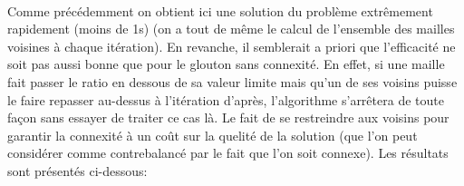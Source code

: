 \documentclass[a4paper, 11pt]{article} %
\begin{document}
\paragraph*{}
Comme précédemment on obtient ici une solution du problème extrêmement rapidement (moins de 1s) (on a tout de même le calcul de l'ensemble des mailles voisines à chaque itération). En revanche, il semblerait a priori que l'efficacité ne soit pas aussi bonne que pour le glouton sans connexité. En effet, si une maille fait passer le ratio en dessous de sa valeur limite mais qu'un de ses voisins puisse le faire repasser au-dessus à l'itération d'après, l'algorithme s'arrêtera de toute façon sans essayer de traiter ce cas là. Le fait de se restreindre aux voisins pour garantir la connexité à un coût sur la quelité de la solution (que l'on peut considérer comme contrebalancé par le fait que l'on soit connexe). Les résultats sont présentés ci-dessous:
 
\end{document}
